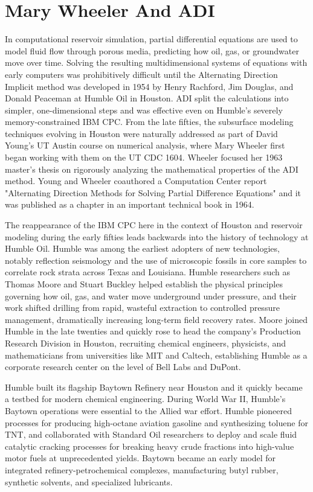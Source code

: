 \chapter{Mary Wheeler And ADI}

In computational reservoir simulation, partial differential equations are used to model fluid flow through porous media, predicting how oil, gas, or groundwater move over time. Solving the resulting multidimensional systems of equations with early computers was prohibitively difficult until the Alternating Direction Implicit method was developed in 1954 by Henry Rachford, Jim Douglas, and Donald Peaceman at Humble Oil in Houston. ADI split the calculations into simpler, one-dimensional steps and was effective even on Humble's severely memory-constrained IBM CPC. From the late fifties, the subsurface modeling techniques evolving in Houston were naturally addressed as part of David Young’s UT Austin course on numerical analysis, where Mary Wheeler first began working with them on the UT CDC 1604. Wheeler focused her 1963 master's thesis on rigorously analyzing the mathematical properties of the ADI method. Young and Wheeler coauthored a Computation Center report "Alternating Direction Methods for Solving Partial Difference Equations" and it was published as a chapter in an important technical book in 1964. \cite{wheelerAlternatingDirectionMethods1964}

The reappearance of the IBM CPC here in the context of Houston and reservoir modeling during the early fifties leads backwards into the history of technology at Humble Oil. Humble was among the earliest adopters of new technologies, notably reflection seismology and the use of microscopic fossils in core samples to correlate rock strata across Texas and Louisiana. Humble researchers such as Thomas Moore and Stuart Buckley helped establish the physical principles governing how oil, gas, and water move underground under pressure, and their work shifted drilling from rapid, wasteful extraction to controlled pressure management, dramatically increasing long-term field recovery rates. Moore joined Humble in the late twenties and quickly rose to head the company’s Production Research Division in Houston, recruiting chemical engineers, physicists, and mathematicians from universities like MIT and Caltech, establishing Humble as a corporate research center on the level of Bell Labs and DuPont. \cite{prattExxonTransformingEnergy2013} \cite{larsonHistoryHumbleOil1959}

Humble built its flagship Baytown Refinery near Houston and it quickly became a testbed for modern chemical engineering. During World War II, Humble’s Baytown operations were essential to the Allied war effort. Humble pioneered processes for producing high-octane aviation gasoline and synthesizing toluene for TNT, and collaborated with Standard Oil researchers to deploy and scale fluid catalytic cracking processes for breaking heavy crude fractions into high-value motor fuels at unprecedented yields. Baytown became an early model for integrated refinery-petrochemical complexes, manufacturing butyl rubber, synthetic solvents, and specialized lubricants.

